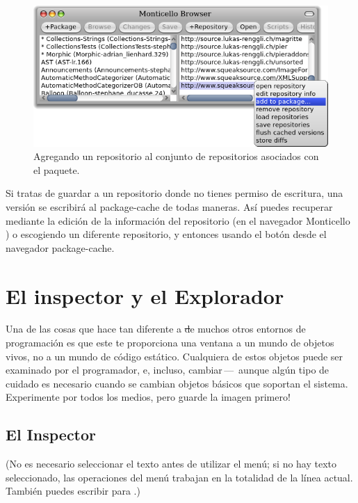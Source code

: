 \documentclass[spanish,a4paper,10pt,twoside]{book}
\begin{document}
\begin{figure}[tbp]
	\begin{center}
		\includegraphics[width=\textwidth]{MCaddToPackage}
	\end{center}
	\caption{Agregando un repositorio al conjunto de repositorios asociados con el paquete.}
\end{figure}

Si tratas de guardar a un repositorio donde no tienes permiso de escritura, una versi\'on se escribir\'a al package-cache de todas maneras.
As\'i puedes recuperar mediante la edici\'on de la informaci\'on del repositorio
(\actclick en el navegador Monticello ) o escogiendo un diferente repositorio, y
entonces usando el bot\'on  desde el navegador package-cache.

\section{El inspector y el Explorador}

Una de las cosas que hace tan diferente a \st de muchos otros entornos de programaci\'on es que este te proporciona una ventana a un mundo de objetos vivos, no a un mundo de c\'odigo est\'atico.
Cualquiera de estos objetos puede ser examinado por el programador, e, incluso, cambiar\,---\, aunque alg\'un tipo de cuidado es necesario cuando se cambian objetos b\'asicos que soportan el sistema.
Experimente por todos los medios, pero guarde la imagen primero!

\subsection{El Inspector}

(No es necesario seleccionar el texto antes de utilizar el men\'u; si no hay texto seleccionado, las operaciones del men\'u trabajan en la totalidad de la l\'inea actual.
Tambi\'en puedes escribir  para .)
\end{document}
